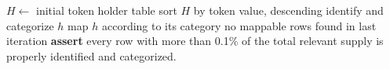 \begin{tcolorbox}[colback=mint, colframe=darkmint, coltitle=white,
  fontupper = \scriptsize, fonttitle= \bfseries\scriptsize,
  boxrule = 0mm, arc = 0mm,
  boxsep = 1.3mm, left = 0mm, right = 0mm, top = 0.5mm, bottom = 0mm, middle=0mm,title={Iterative mapping process}]
\begin{algorithmic}
\State $H \gets$ initial token holder table
\Repeat
	\State sort $H$ by token value, descending
		\State identify and categorize $h$
			\State map $h$ according to its category
		\EndIf
	\EndFor
\Until no mappable rows found in last iteration
\State \textbf{assert} every row with more than 0.1\% of the total relevant supply is properly identified and categorized.
\end{algorithmic}
\end{tcolorbox}
